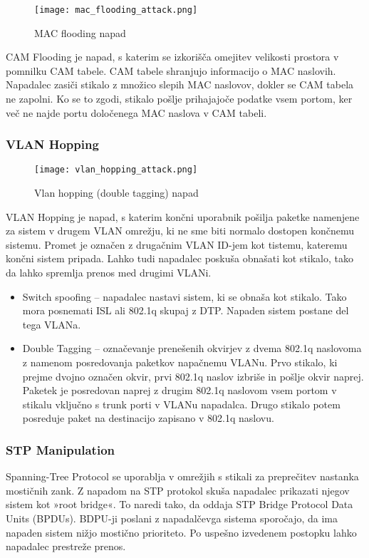 \documentclass[12pt]{article}
\begin{document}
\begin{figure}[htb]
\begin{center}
\texttt{[image: mac\_flooding\_attack.png]}
\end{center}
\caption{MAC flooding napad}
\label{mac_flooding}
\end{figure}

CAM Flooding je napad, s katerim se izkorišča omejitev velikosti prostora v pomnilku CAM tabele. CAM tabele shranjujo informacijo o MAC naslovih. Napadalec zasiči stikalo z množico slepih MAC naslovov, dokler se CAM tabela ne zapolni. Ko se to zgodi, stikalo pošlje prihajajoče podatke vsem portom, ker več ne najde portu določenega MAC naslova v CAM tabeli.  


\subsubsection{VLAN Hopping}

\begin{figure}[htb]
\begin{center}
\texttt{[image: vlan\_hopping\_attack.png]}
\end{center}
\caption{Vlan hopping (double tagging) napad}
\label{vlan_hopping}
\end{figure}

VLAN Hopping je napad, s katerim končni uporabnik pošilja paketke namenjene za sistem v drugem VLAN omrežju, ki ne sme biti normalo dostopen končnemu sistemu. Promet je označen z drugačnim VLAN ID-jem kot tistemu, kateremu končni sistem pripada. Lahko tudi napadalec poskuša obnašati kot stikalo, tako da lahko spremlja prenos med drugimi VLANi.
\begin{itemize}
    \item Switch spoofing – napadalec nastavi sistem, ki se obnaša kot stikalo. Tako mora posnemati ISL ali 802.1q skupaj z DTP. Napaden sistem postane del tega VLANa.
    \item Double Tagging – označevanje prenešenih okvirjev z dvema 802.1q naslovoma z namenom posredovanja paketkov napačnemu VLANu. Prvo stikalo, ki prejme dvojno označen okvir, prvi 802.1q naslov izbriše in pošlje okvir naprej. Paketek je posredovan naprej z drugim 802.1q naslovom vsem portom v stikalu vključno s trunk porti v VLANu napadalca. Drugo stikalo potem posreduje paket na destinacijo zapisano v 802.1q naslovu.
\end{itemize}


\subsubsection{STP Manipulation}
Spanning-Tree Protocol se uporablja v omrežjih s stikali za preprečitev nastanka mostičnih zank. Z napadom na STP protokol skuša napadalec prikazati njegov sistem kot »root bridge«. To naredi tako, da oddaja STP Bridge Protocol Data Units (BPDUs). BDPU-ji poslani z napadalčevga sistema sporočajo, da ima napaden sistem nižjo mostično prioriteto. Po uspešno izvedenem postopku lahko napadalec prestreže prenos.
\end{document}
